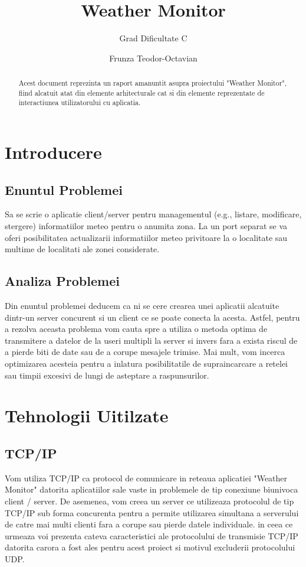 \documentclass{llncs}
\begin{document}
%
\title{Weather Monitor}
%
\subtitle{Grad Dificultate C}
%
\author{Frunza Teodor-Octavian}
%
%
\maketitle
%
\begin{abstract}
Acest document reprezinta un raport amanuntit asupra proiectului "Weather Monitor", fiind alcatuit atat din elemente arhitecturale cat si din elemente reprezentate de interactiunea utilizatorului cu aplicatia.
\end{abstract}
%
\section{Introducere}
%
\subsection{Enuntul Problemei}
Sa se scrie o aplicatie client/server pentru managementul (e.g., listare, modificare, stergere) informatiilor meteo pentru o anumita zona. La un port separat se va oferi posibilitatea actualizarii informatiilor meteo privitoare la o localitate sau multime de localitati ale zonei considerate.
%
\subsection{Analiza Problemei}
Din enuntul problemei deducem ca ni se cere crearea unei aplicatii alcatuite dintr-un server concurent si un client ce se poate conecta la acesta.
Astfel, pentru a rezolva aceasta problema vom cauta spre a utiliza o metoda optima de transmitere a datelor de la useri multipli la server si invers fara a exista riscul de a pierde biti de date sau de a corupe mesajele trimise. Mai mult, vom incerca optimizarea acesteia pentru a inlatura posibilitatile de supraincarcare a retelei sau timpii excesivi de lungi de asteptare a raspunsurilor.
%
\section{Tehnologii Uitilzate}
%
\subsection{TCP/IP}
Vom utiliza TCP/IP ca protocol de comunicare in reteaua aplicatiei "Weather Monitor" datorita aplicatiilor sale vaste in problemele de tip conexiune biunivoca client / server. De asemenea, vom creea un server ce utilizeaza protocolul de tip TCP/IP sub forma concurenta pentru a permite utilizarea simultana a serverului de catre mai multi clienti fara a corupe sau pierde datele individuale. in ceea ce urmeaza voi prezenta cateva caracteristici ale protocolului de transmisie TCP/IP datorita carora a fost ales pentru acest proiect si motivul excluderii protocolului UDP.
%
\end{document}
